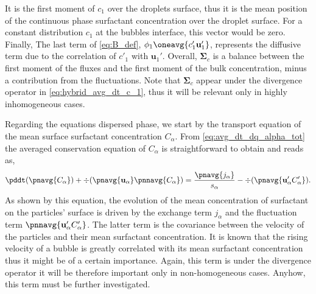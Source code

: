It is the first moment of $c_1$ over the droplets surface, thus it is the mean position of the continuous phase surfactant concentration over the droplet surface.
For a constant distribution $c_1$ at the bubbles interface, this vector would be zero. 
Finally, The last term of \ref{eq:B_def}, $\phi_1\oneavg{c'_1\textbf{u}_1'}$, represents the diffusive term due to the correlation of $c'_1$ with $\textbf{u}_1'$.
Overall, $\mathbf{\Sigma}_c$ is a balance between the first moment of the fluxes and the first moment of the bulk concentration, minus a contribution from the fluctuations.
Note that $\mathbf{\Sigma}_c$ appear under the divergence operator in \ref{eq:hybrid_avg_dt_c_1}, thus it will be relevant only in highly inhomogeneous cases. 

Regarding the equations dispersed phase, we start by the transport equation of the mean surface surfactant concentration $C_\alpha$.
From \ref{eq:avg_dt_dq_alpha_tot} the averaged conservation equation of $C_\alpha$ is straightforward to obtain and reads as,
\begin{equation}
    \pddt (\pnavg{C_\alpha})
    + \div (\pnavg{\textbf{u}_\alpha} \pnnavg{C_\alpha})
    =
    \frac{\pnavg{j_\alpha}}{s_\alpha}
    - \div (\pnavg{\textbf{u}_\alpha' C'_\alpha}).
    \label{eq:avg_dt_dC_alpha}
\end{equation}
As shown by this equation, the evolution of the mean concentration of surfactant on the particles' surface is driven by the exchange term $j_\alpha$ and the fluctuation term $\pnnavg{\textbf{u}_\alpha' C_\alpha'}$. 
The latter term is the covariance between the velocity of the particles and their mean surfactant concentration. 
It is known that the rising velocity of a bubble is greatly correlated with its mean surfactant concentration \citet{kentheswaran2022direct} thus it might be of a certain importance. 
Again, this term is under the divergence operator it will be therefore important only in non-homogeneous cases. 
Anyhow, this term must be further investigated.

